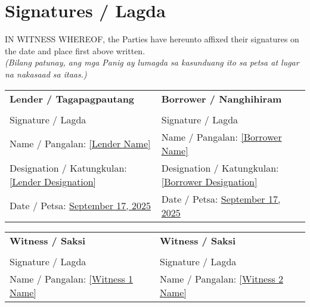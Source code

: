 \documentclass[a4paper,12pt]{article}
\begin{document}
\section*{Signatures / Lagda}
IN WITNESS WHEREOF, the Parties have hereunto affixed their signatures on the date and place first above written. \\
\textit{(Bilang patunay, ang mga Panig ay lumagda sa kasunduang ito sa petsa at lugar na nakasaad sa itaas.)}
\vspace{0.5cm}
\begin{tabular}{p{} p{}}
\textbf{Lender / Tagapagpautang} & \textbf{Borrower / Nanghihiram} \\
\vspace{2cm} \hrulefill & \vspace{2cm} \hrulefill \\
Signature / Lagda & Signature / Lagda \\
Name / Pangalan: \underline{[Lender Name]} & Name / Pangalan: \underline{[Borrower Name]} \\
Designation / Katungkulan: \underline{[Lender Designation]} & Designation / Katungkulan: \underline{[Borrower Designation]} \\
Date / Petsa: \underline{September 17, 2025} & Date / Petsa: \underline{September 17, 2025} \\
\end{tabular}
\vspace{0.5cm}
\begin{tabular}{p{} p{}}
\textbf{Witness / Saksi} & \textbf{Witness / Saksi} \\
\vspace{2cm} \hrulefill & \vspace{2cm} \hrulefill \\
Signature / Lagda & Signature / Lagda \\
Name / Pangalan: \underline{[Witness 1 Name]} & Name / Pangalan: \underline{[Witness 2 Name]} \\
\end{tabular}
\newpage
\end{document}
